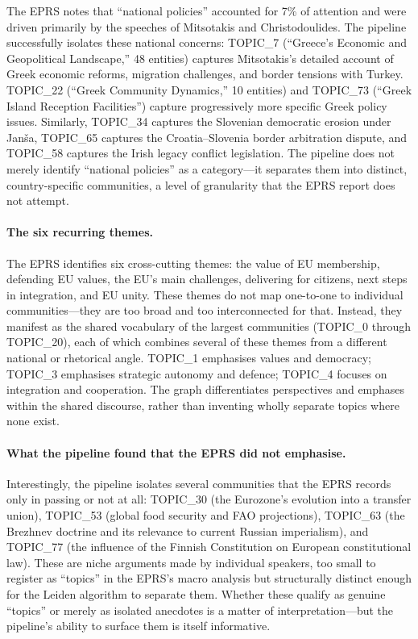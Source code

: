 \documentclass[11pt]{article}
\begin{document}
The EPRS notes that ``national policies'' accounted for 7\% of attention and were driven primarily by the speeches of Mitsotakis and Christodoulides. The pipeline successfully isolates these national concerns: TOPIC\_7 (``Greece's Economic and Geopolitical Landscape,'' 48 entities) captures Mitsotakis's detailed account of Greek economic reforms, migration challenges, and border tensions with Turkey. TOPIC\_22 (``Greek Community Dynamics,'' 10 entities) and TOPIC\_73 (``Greek Island Reception Facilities'') capture progressively more specific Greek policy issues. Similarly, TOPIC\_34 captures the Slovenian democratic erosion under Jan\v{s}a, TOPIC\_65 captures the Croatia--Slovenia border arbitration dispute, and TOPIC\_58 captures the Irish legacy conflict legislation. The pipeline does not merely identify ``national policies'' as a category---it separates them into distinct, country-specific communities, a level of granularity that the EPRS report does not attempt.

\paragraph{The six recurring themes.}

The EPRS identifies six cross-cutting themes: the value of EU membership, defending EU values, the EU's main challenges, delivering for citizens, next steps in integration, and EU unity. These themes do not map one-to-one to individual communities---they are too broad and too interconnected for that. Instead, they manifest as the shared vocabulary of the largest communities (TOPIC\_0 through TOPIC\_20), each of which combines several of these themes from a different national or rhetorical angle. TOPIC\_1 emphasises values and democracy; TOPIC\_3 emphasises strategic autonomy and defence; TOPIC\_4 focuses on integration and cooperation. The graph differentiates perspectives and emphases within the shared discourse, rather than inventing wholly separate topics where none exist.

\paragraph{What the pipeline found that the EPRS did not emphasise.}

Interestingly, the pipeline isolates several communities that the EPRS records only in passing or not at all: TOPIC\_30 (the Eurozone's evolution into a transfer union), TOPIC\_53 (global food security and FAO projections), TOPIC\_63 (the Brezhnev doctrine and its relevance to current Russian imperialism), and TOPIC\_77 (the influence of the Finnish Constitution on European constitutional law). These are niche arguments made by individual speakers, too small to register as ``topics'' in the EPRS's macro analysis but structurally distinct enough for the Leiden algorithm to separate them. Whether these qualify as genuine ``topics'' or merely as isolated anecdotes is a matter of interpretation---but the pipeline's ability to surface them is itself informative.
\end{document}
